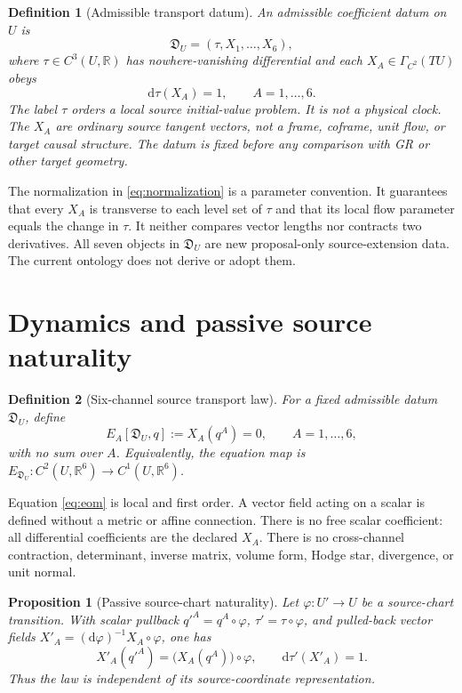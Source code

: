 \documentclass[11pt]{article}
\newcommand{\D}{\mathfrak D}
\newcommand{\R}{\mathbb R}
\newcommand{\dd}{\mathrm d}
\newtheorem{definition}{Definition}
\newtheorem{proposition}{Proposition}
\begin{document}
\begin{definition}[Admissible transport datum]
An admissible coefficient datum on $U$ is
\begin{equation}
  \D_U=(\tau,X_1,\ldots,X_6),
  \label{eq:datum}
\end{equation}
where $\tau\in C^3(U,\R)$ has nowhere-vanishing differential and each
$X_A\in\Gamma_{C^2}(TU)$ obeys
\begin{equation}
  \dd\tau(X_A)=1,
  \qquad A=1,\ldots,6.
  \label{eq:normalization}
\end{equation}
The label $\tau$ orders a local source initial-value problem.  It is not a
physical clock.  The $X_A$ are ordinary source tangent vectors, not a frame,
coframe, unit flow, or target causal structure.  The datum is fixed before any
comparison with GR or other target geometry.
\end{definition}

The normalization in \eqref{eq:normalization} is a parameter convention.  It
guarantees that every $X_A$ is transverse to each level set of $\tau$ and that
its local flow parameter equals the change in $\tau$.  It neither compares
vector lengths nor contracts two derivatives.  All seven objects in
$\D_U$ are new proposal-only source-extension data.  The current ontology does
not derive or adopt them.

\section{Dynamics and passive source naturality}

\begin{definition}[Six-channel source transport law]
For a fixed admissible datum $\D_U$, define
\begin{equation}
  E_A[\D_U,q]:=X_A(q^A)=0,
  \qquad A=1,\ldots,6,
  \label{eq:eom}
\end{equation}
with no sum over $A$.  Equivalently, the equation map is
$E_{\D_U}:C^2(U,\R^6)\to C^1(U,\R^6)$.
\end{definition}

Equation \eqref{eq:eom} is local and first order.  A vector field acting on a
scalar is defined without a metric or affine connection.  There is no free
scalar coefficient: all differential coefficients are the declared $X_A$.
There is no cross-channel contraction, determinant, inverse matrix, volume
form, Hodge star, divergence, or unit normal.

\begin{proposition}[Passive source-chart naturality]
Let $\varphi:U'\to U$ be a source-chart transition.  With scalar pullback
$q'^A=q^A\circ\varphi$, $\tau'=\tau\circ\varphi$, and pulled-back vector
fields $X'_A=(\dd\varphi)^{-1}X_A\circ\varphi$, one has
\begin{equation}
  X'_A(q'^A)=\bigl(X_A(q^A)\bigr)\circ\varphi,
  \qquad
  \dd\tau'(X'_A)=1.
\end{equation}
Thus the law is independent of its source-coordinate representation.
\end{proposition}
\end{document}
